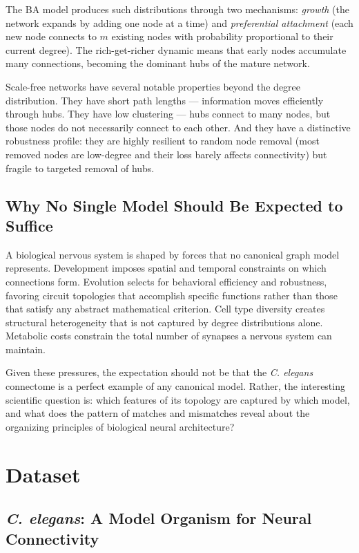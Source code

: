 \documentclass[12pt,a4paper]{report}
\begin{document}
The BA model produces such distributions through two mechanisms: \textit{growth} (the network expands by adding one node at a time) and \textit{preferential attachment} (each new node connects to $m$ existing nodes with probability proportional to their current degree). The rich-get-richer dynamic means that early nodes accumulate many connections, becoming the dominant hubs of the mature network.

Scale-free networks have several notable properties beyond the degree distribution. They have short path lengths — information moves efficiently through hubs. They have low clustering — hubs connect to many nodes, but those nodes do not necessarily connect to each other. And they have a distinctive robustness profile: they are highly resilient to random node removal (most removed nodes are low-degree and their loss barely affects connectivity) but fragile to targeted removal of hubs.

\section{Why No Single Model Should Be Expected to Suffice}

A biological nervous system is shaped by forces that no canonical graph model represents. Development imposes spatial and temporal constraints on which connections form. Evolution selects for behavioral efficiency and robustness, favoring circuit topologies that accomplish specific functions rather than those that satisfy any abstract mathematical criterion. Cell type diversity creates structural heterogeneity that is not captured by degree distributions alone. Metabolic costs constrain the total number of synapses a nervous system can maintain.

Given these pressures, the expectation should not be that the \textit{C. elegans} connectome is a perfect example of any canonical model. Rather, the interesting scientific question is: which features of its topology are captured by which model, and what does the pattern of matches and mismatches reveal about the organizing principles of biological neural architecture?


\chapter{Dataset}

\section{\textit{C. elegans}: A Model Organism for Neural Connectivity}
\end{document}
